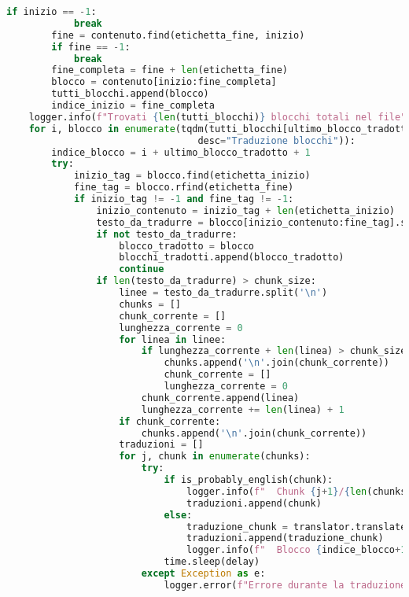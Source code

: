 \documentclass[a4paper,12pt]{article}
\begin{document}
\begin{lstlisting}[language=Python, caption=Versione 1.0 del traduttore]
        if inizio == -1:
            break
        fine = contenuto.find(etichetta_fine, inizio)
        if fine == -1:
            break
        fine_completa = fine + len(etichetta_fine)
        blocco = contenuto[inizio:fine_completa]
        tutti_blocchi.append(blocco)
        indice_inizio = fine_completa
    logger.info(f"Trovati {len(tutti_blocchi)} blocchi totali nel file")
    for i, blocco in enumerate(tqdm(tutti_blocchi[ultimo_blocco_tradotto+1:], 
                                  desc="Traduzione blocchi")):
        indice_blocco = i + ultimo_blocco_tradotto + 1
        try:
            inizio_tag = blocco.find(etichetta_inizio)
            fine_tag = blocco.rfind(etichetta_fine)
            if inizio_tag != -1 and fine_tag != -1:
                inizio_contenuto = inizio_tag + len(etichetta_inizio)
                testo_da_tradurre = blocco[inizio_contenuto:fine_tag].strip()
                if not testo_da_tradurre:
                    blocco_tradotto = blocco
                    blocchi_tradotti.append(blocco_tradotto)
                    continue
                if len(testo_da_tradurre) > chunk_size:
                    linee = testo_da_tradurre.split('\n')
                    chunks = []
                    chunk_corrente = []
                    lunghezza_corrente = 0
                    for linea in linee:
                        if lunghezza_corrente + len(linea) > chunk_size and chunk_corrente:
                            chunks.append('\n'.join(chunk_corrente))
                            chunk_corrente = []
                            lunghezza_corrente = 0
                        chunk_corrente.append(linea)
                        lunghezza_corrente += len(linea) + 1
                    if chunk_corrente:
                        chunks.append('\n'.join(chunk_corrente))
                    traduzioni = []
                    for j, chunk in enumerate(chunks):
                        try:
                            if is_probably_english(chunk):
                                logger.info(f"  Chunk {j+1}/{len(chunks)} già in inglese, salto traduzione")
                                traduzioni.append(chunk)
                            else:
                                traduzione_chunk = translator.translate(chunk)
                                traduzioni.append(traduzione_chunk)
                                logger.info(f"  Blocco {indice_blocco+1}/{len(tutti_blocchi)}: Chunk {j+1}/{len(chunks)} tradotto")
                            time.sleep(delay)
                        except Exception as e:
                            logger.error(f"Errore durante la traduzione del chunk {j+1}: {e}")

\end{lstlisting}
\end{document}
